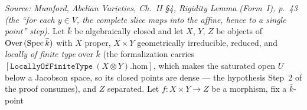 \begin{lemma}
  \label{lem:rigidity_eqOn_saturated_open_to_affine}

  \textit{Source: Mumford, Abelian Varieties, Ch.~II \S4, Rigidity Lemma (Form~I), p.~43 (the
  ``for each \(y \in V\), the complete slice maps into the affine, hence to a single point'' step).}
  Let \(\bar k\) be algebraically closed and let \(X\), \(Y\), \(Z\) be objects of
  \(\mathrm{Over}\,(\operatorname{Spec} \bar k)\) with \(X\) proper, \(X \times Y\) geometrically irreducible, reduced,
  and \emph{locally of finite type} over \(\bar k\) (the formalization carries
  \([\mathtt{LocallyOfFiniteType}\ (X \otimes Y).\mathrm{hom}]\), which makes the saturated open \(U\)
  below a Jacobson space, so its closed points are dense --- the hypothesis Step~2 of the proof
  consumes), and \(Z\) separated. Let \(f \colon X \times Y \to Z\) be a morphism, fix a \(\bar k\)-point

\end{lemma}
